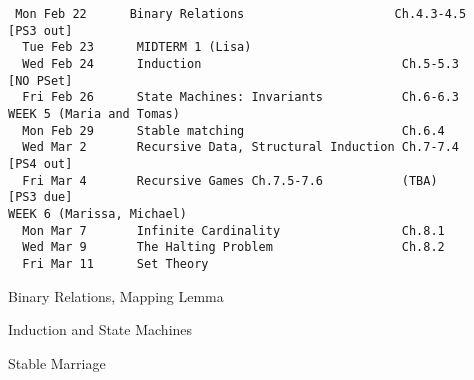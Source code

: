 \documentclass[quiz]{mcs}
\renewcommand{\examspace}{}
\begin{document}

\begin{staffnotes}

\begin{verbatim}
 Mon Feb 22      Binary Relations                     Ch.4.3-4.5           [PS3 out]
  Tue Feb 23      MIDTERM 1 (Lisa)
  Wed Feb 24      Induction                            Ch.5-5.3             [NO PSet]
  Fri Feb 26      State Machines: Invariants           Ch.6-6.3
WEEK 5 (Maria and Tomas)
  Mon Feb 29      Stable matching                      Ch.6.4
  Wed Mar 2       Recursive Data, Structural Induction Ch.7-7.4             [PS4 out]
  Fri Mar 4       Recursive Games Ch.7.5-7.6           (TBA)                [PS3 due]
WEEK 6 (Marissa, Michael)
  Mon Mar 7       Infinite Cardinality                 Ch.8.1
  Wed Mar 9       The Halting Problem                  Ch.8.2
  Fri Mar 11      Set Theory     
\end{verbatim}
\end{staffnotes}

\begin{staffnotes}
\begin{center}
{\large Binary Relations, Mapping Lemma}
\end{center}
\end{staffnotes}

%

\begin{staffnotes}
\begin{center}
{\large Induction and State Machines}
\end{center}
\end{staffnotes}


\examspace


\examspace

\begin{staffnotes}
\begin{center}
{\large Stable Marriage}
\end{center}
\end{staffnotes}
\end{document}

